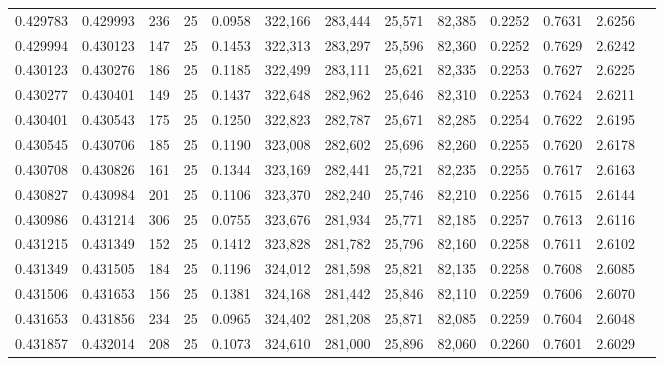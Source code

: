 \begin{tabular}{rrrrrrrrrrrrr}
0.429783 & 0.429993 &   236 &  25 &                                     0.0958 & 322,166 & 283,444 &  25,571 &  82,385 & 0.2252 & 0.7631 & 2.6256 \\
0.429994 & 0.430123 &   147 &  25 &                                     0.1453 & 322,313 & 283,297 &  25,596 &  82,360 & 0.2252 & 0.7629 & 2.6242 \\
0.430123 & 0.430276 &   186 &  25 &                                     0.1185 & 322,499 & 283,111 &  25,621 &  82,335 & 0.2253 & 0.7627 & 2.6225 \\
0.430277 & 0.430401 &   149 &  25 &                                     0.1437 & 322,648 & 282,962 &  25,646 &  82,310 & 0.2253 & 0.7624 & 2.6211 \\
0.430401 & 0.430543 &   175 &  25 &                                     0.1250 & 322,823 & 282,787 &  25,671 &  82,285 & 0.2254 & 0.7622 & 2.6195 \\
0.430545 & 0.430706 &   185 &  25 &                                     0.1190 & 323,008 & 282,602 &  25,696 &  82,260 & 0.2255 & 0.7620 & 2.6178 \\
0.430708 & 0.430826 &   161 &  25 &                                     0.1344 & 323,169 & 282,441 &  25,721 &  82,235 & 0.2255 & 0.7617 & 2.6163 \\
0.430827 & 0.430984 &   201 &  25 &                                     0.1106 & 323,370 & 282,240 &  25,746 &  82,210 & 0.2256 & 0.7615 & 2.6144 \\
0.430986 & 0.431214 &   306 &  25 &                                     0.0755 & 323,676 & 281,934 &  25,771 &  82,185 & 0.2257 & 0.7613 & 2.6116 \\
0.431215 & 0.431349 &   152 &  25 &                                     0.1412 & 323,828 & 281,782 &  25,796 &  82,160 & 0.2258 & 0.7611 & 2.6102 \\
0.431349 & 0.431505 &   184 &  25 &                                     0.1196 & 324,012 & 281,598 &  25,821 &  82,135 & 0.2258 & 0.7608 & 2.6085 \\
0.431506 & 0.431653 &   156 &  25 &                                     0.1381 & 324,168 & 281,442 &  25,846 &  82,110 & 0.2259 & 0.7606 & 2.6070 \\
0.431653 & 0.431856 &   234 &  25 &                                     0.0965 & 324,402 & 281,208 &  25,871 &  82,085 & 0.2259 & 0.7604 & 2.6048 \\
0.431857 & 0.432014 &   208 &  25 &                                     0.1073 & 324,610 & 281,000 &  25,896 &  82,060 & 0.2260 & 0.7601 & 2.6029 \\

\end{tabular}
